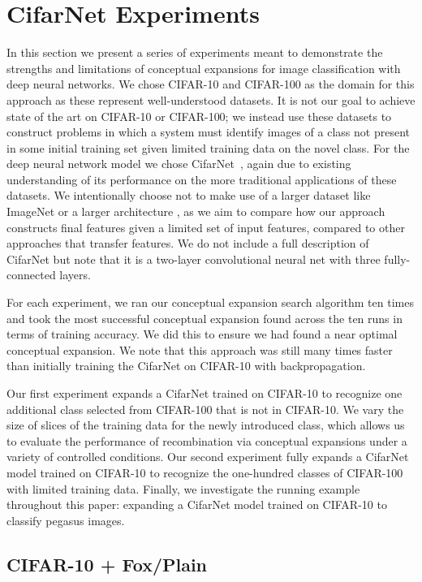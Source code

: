 \documentclass[letterpaper]{article}
\begin{document}
\section{CifarNet Experiments}

In this section we present a series of experiments meant to demonstrate the strengths and limitations of conceptual expansions for image classification with deep neural networks. 
We chose CIFAR-10 and CIFAR-100 \cite{krizhevsky2009learning} as the domain for this approach as these represent well-understood datasets. 
It is not our goal to achieve state of the art on CIFAR-10 or CIFAR-100; we instead use these datasets to construct problems in which a system must identify images of a class not present in some initial training set given limited training data on the novel class. For the deep neural network model we chose CifarNet~\cite{krizhevsky2009learning}, again due to existing understanding of its performance on the more traditional applications of these datasets. 
We intentionally choose not to make use of a larger dataset like ImageNet or a larger architecture \cite{imagenet_cvpr09}, as we aim to compare how our approach constructs final features given a limited set of input features, compared to other approaches that transfer features.
We do not include a full description of CifarNet but note that it is a two-layer convolutional neural net with three fully-connected layers. 

For each experiment, we ran our conceptual expansion search algorithm ten times and took the most successful conceptual expansion found across the ten runs in terms of training accuracy. 
We did this to ensure we had found a near optimal conceptual expansion.
We note that this approach was still many times faster than initially training the CifarNet on CIFAR-10 with backpropagation.

Our first experiment expands a CifarNet trained on CIFAR-10 to recognize one additional class selected from CIFAR-100 that is not in CIFAR-10.
We vary the size of slices of the training data for the newly introduced class,
which allows us to evaluate the performance of recombination via conceptual expansions under a variety of controlled conditions.
Our second experiment fully expands a CifarNet model trained on CIFAR-10 to recognize the one-hundred classes of CIFAR-100 with limited training data. 
Finally, we investigate the running example throughout this paper: expanding a CifarNet model trained on CIFAR-10 to classify pegasus images.

\subsection{CIFAR-10 + Fox/Plain}
\end{document}
